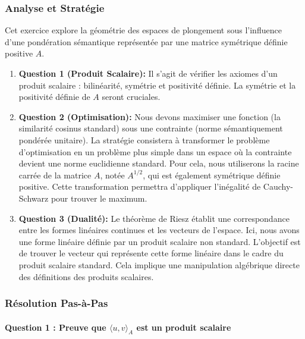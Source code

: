 \documentclass[11pt,a4paper]{report}
\begin{document}
\hypertarget{analyse-et-stratuxe9gie}{%
\subsubsection{Analyse et Stratégie}\label{analyse-et-stratuxe9gie}}

Cet exercice explore la géométrie des espaces de plongement sous
l'influence d'une pondération sémantique représentée par une matrice
symétrique définie positive \(A\).

\begin{enumerate}
\def\labelenumi{\arabic{enumi}.}
\item
  \textbf{Question 1 (Produit Scalaire):} Il s'agit de vérifier les
  axiomes d'un produit scalaire : bilinéarité, symétrie et positivité
  définie. La symétrie et la positivité définie de \(A\) seront
  cruciales.
\item
  \textbf{Question 2 (Optimisation):} Nous devons maximiser une fonction
  (la similarité cosinus standard) sous une contrainte (norme
  sémantiquement pondérée unitaire). La stratégie consistera à
  transformer le problème d'optimisation en un problème plus simple dans
  un espace où la contrainte devient une norme euclidienne standard.
  Pour cela, nous utiliserons la racine carrée de la matrice \(A\),
  notée \(A^{1/2}\), qui est également symétrique définie positive.
  Cette transformation permettra d'appliquer l'inégalité de
  Cauchy-Schwarz pour trouver le maximum.
\item
  \textbf{Question 3 (Dualité):} Le théorème de Riesz établit une
  correspondance entre les formes linéaires continues et les vecteurs de
  l'espace. Ici, nous avons une forme linéaire définie par un produit
  scalaire non standard. L'objectif est de trouver le vecteur qui
  représente cette forme linéaire dans le cadre du produit scalaire
  standard. Cela implique une manipulation algébrique directe des
  définitions des produits scalaires.
\end{enumerate}

\hypertarget{ruxe9solution-pas-uxe0-pas}{%
\subsubsection{Résolution Pas-à-Pas}\label{ruxe9solution-pas-uxe0-pas}}

\hypertarget{question-1-preuve-que-langle-u-v-rangle_a-est-un-produit-scalaire}{%
\paragraph{\texorpdfstring{Question 1 : Preuve que
\(\langle u, v \rangle_A\) est un produit
scalaire}{Question 1 : Preuve que \textbackslash langle u, v \textbackslash rangle\_A est un produit scalaire}}\label{question-1-preuve-que-langle-u-v-rangle_a-est-un-produit-scalaire}}
\end{document}
